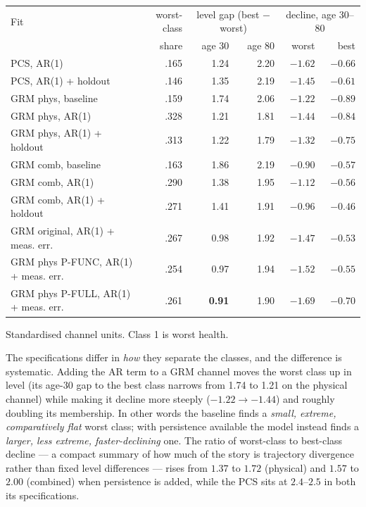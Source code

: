 \documentclass[11pt]{article}
\begin{document}
\begin{center}\small
\begin{tabular}{lrrrrr}
\toprule
Fit & worst-class & \multicolumn{2}{c}{level gap (best $-$ worst)} &
\multicolumn{2}{c}{decline, age 30--80} \\
 & share & age 30 & age 80 & worst & best \\
\midrule
PCS, AR(1) & .165 & 1.24 & 2.20 & $-1.62$ & $-0.66$ \\
PCS, AR(1) + holdout & .146 & 1.35 & 2.19 & $-1.45$ & $-0.61$ \\
GRM phys, baseline & .159 & 1.74 & 2.06 & $-1.22$ & $-0.89$ \\
GRM phys, AR(1) & .328 & 1.21 & 1.81 & $-1.44$ & $-0.84$ \\
GRM phys, AR(1) + holdout & .313 & 1.22 & 1.79 & $-1.32$ & $-0.75$ \\
GRM comb, baseline & .163 & 1.86 & 2.19 & $-0.90$ & $-0.57$ \\
GRM comb, AR(1) & .290 & 1.38 & 1.95 & $-1.12$ & $-0.56$ \\
GRM comb, AR(1) + holdout & .271 & 1.41 & 1.91 & $-0.96$ & $-0.46$ \\
\addlinespace
GRM original, AR(1) + meas. err. & .267 & 0.98 & 1.92 & $-1.47$ & $-0.53$ \\
GRM phys P-FUNC, AR(1) + meas. err. & .254 & 0.97 & 1.94 & $-1.52$ & $-0.55$ \\
GRM phys P-FULL, AR(1) + meas. err. & .261 & \textbf{0.91} & 1.90 & $\mathbf{-1.69}$ & $-0.70$ \\
\bottomrule
\end{tabular}

{\scriptsize Standardised channel units. Class 1 is worst health.}
\end{center}

The specifications differ in \emph{how} they separate the classes, and the
difference is systematic. Adding the AR term to a GRM channel moves the
worst class up in level (its age-30 gap to the best class narrows from 1.74
to 1.21 on the physical channel) while making it decline more steeply
($-1.22 \to -1.44$) and roughly doubling its membership. In other words the
baseline finds a \emph{small, extreme, comparatively flat} worst class; with
persistence available the model instead finds a \emph{larger, less extreme,
faster-declining} one. The ratio of worst-class to best-class decline --- a
compact summary of how much of the story is trajectory divergence rather
than fixed level differences --- rises from $1.37$ to $1.72$ (physical) and
$1.57$ to $2.00$ (combined) when persistence is added, while the PCS sits
at $2.4$--$2.5$ in both its specifications.
\end{document}
